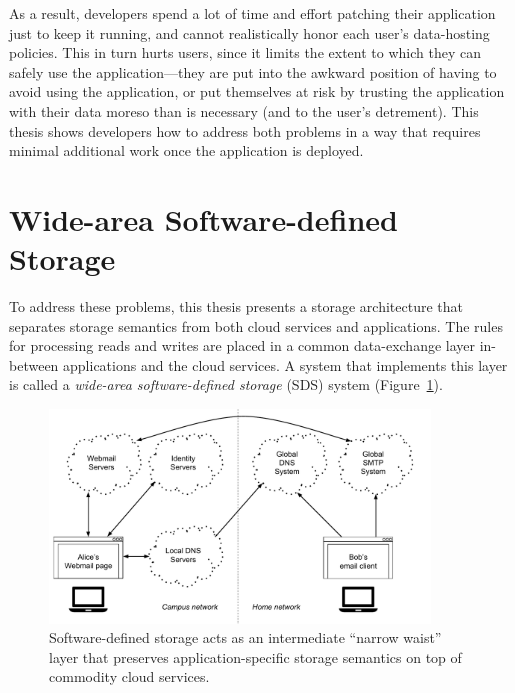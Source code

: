 As a result, developers spend a lot of time and effort patching their
application just to keep it running, and cannot realistically honor
each user's data-hosting policies.  This in turn hurts users, since it
limits the extent to which they can safely use the application---they are put
into the awkward position of having to avoid using the application, or put
themselves at risk by trusting the application with their data moreso than is
necessary (and to the user's detrement).  This thesis shows developers how to
address both problems in a way that requires minimal additional work once the
application is deployed.

\section{Wide-area Software-defined Storage}


To address these problems, this thesis presents a 
storage architecture that separates storage semantics
from both cloud services and applications.  The rules for processing reads and writes
are placed in a common data-exchange
layer in-between applications and the cloud services.  A system that
implements this layer is called a \emph{wide-area software-defined storage} (SDS) system
(Figure~\ref{fig:chap1-sds-overview}).

\begin{figure}[h]
   \centering
   \includegraphics[width=0.9\textwidth,page=28]{figures/dissertation-figures}
   \caption{Software-defined storage acts as an intermediate ``narrow waist''
   layer that preserves application-specific storage semantics on top of
   commodity cloud services.}
   \label{fig:chap1-sds-overview}
\end{figure}

